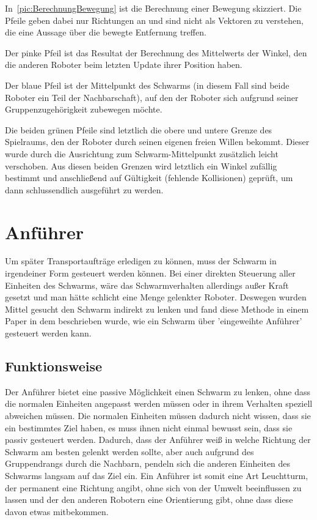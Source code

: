 In~\autoref{pic:BerechnungBewegung} ist die Berechnung einer Bewegung skizziert. Die Pfeile geben dabei nur Richtungen an und sind nicht als Vektoren zu verstehen, die eine Aussage über die bewegte Entfernung treffen.

Der pinke Pfeil ist das Resultat der Berechnung des Mittelwerts der Winkel, den die anderen Roboter beim letzten Update ihrer Position haben.

Der blaue Pfeil ist der Mittelpunkt des Schwarms (in diesem Fall sind beide Roboter ein Teil der Nachbarschaft), auf den der Roboter sich aufgrund seiner Gruppenzugehörigkeit zubewegen möchte.

Die beiden grünen Pfeile sind letztlich die obere und untere Grenze des Spielraums, den der Roboter durch seinen eigenen freien Willen bekommt. Dieser wurde durch die Ausrichtung zum Schwarm-Mittelpunkt zusätzlich leicht verschoben. Aus diesen beiden Grenzen wird letztlich ein Winkel zufällig bestimmt und anschließend auf Gültigkeit (fehlende Kollisionen) geprüft, um dann schlussendlich ausgeführt zu werden.



\section{Anführer}

Um später Transportaufträge erledigen zu können, muss der Schwarm in irgendeiner Form gesteuert werden können. Bei einer direkten Steuerung aller Einheiten des Schwarms, wäre das Schwarmverhalten allerdings außer Kraft gesetzt und man hätte schlicht eine Menge gelenkter Roboter. Deswegen wurden Mittel gesucht den Schwarm indirekt zu lenken und fand diese Methode in einem Paper  in dem beschrieben wurde, wie ein Schwarm über 'eingeweihte Anführer' gesteuert werden kann.

\subsection*{Funktionsweise}
Der Anführer bietet eine passive Möglichkeit einen Schwarm zu lenken, ohne dass die normalen Einheiten angepasst werden müssen oder in ihrem Verhalten speziell abweichen müssen. Die normalen Einheiten müssen dadurch nicht wissen, dass sie ein bestimmtes Ziel haben, es muss ihnen nicht einmal bewusst sein, dass sie passiv gesteuert werden. Dadurch, dass der Anführer weiß in welche Richtung der Schwarm am besten gelenkt werden sollte, aber auch aufgrund des Gruppendrangs durch die Nachbarn, pendeln sich die anderen Einheiten des Schwarms langsam auf das Ziel ein. Ein Anführer ist somit eine Art Leuchtturm, der permanent eine Richtung angibt, ohne sich von der Umwelt beeinflussen zu lassen und der den anderen Robotern eine Orientierung gibt, ohne dass diese davon etwas mitbekommen.

